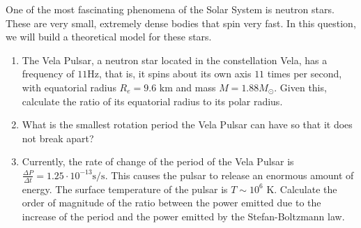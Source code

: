\documentclass[11pt]{article}
\begin{document}
\begin{pproblem} One of the most fascinating phenomena of the Solar System is neutron stars. These are very small, extremely dense bodies that spin very fast. In this question, we will build a theoretical model for these stars.
    \begin{enumerate}[label=\textbf{\alph*)}]
        \item The Vela Pulsar, a neutron star located in the constellation Vela, has a frequency of \(11 \text{Hz}\), that is, it spins about its own axis \(11\) times per second, with equatorial radius \(R_e = 9.6\text{ km}\) and mass \(M = 1.88M_\odot\). Given this, calculate the ratio of its equatorial radius to its polar radius.
        \item What is the smallest rotation period the Vela Pulsar can have so that it does not break apart?
        \item Currently, the rate of change of the period of the Vela Pulsar is \(\frac{\Delta P}{\Delta t} = 1.25 \cdot 10^{-13}\text{s/s}\). This causes the pulsar to release an enormous amount of energy. The surface temperature of the pulsar is \(T \sim 10^6\text{ K}\). Calculate the order of magnitude of the ratio between the power emitted due to the increase of the period and the power emitted by the Stefan-Boltzmann law.
    \end{enumerate}
    
\end{pproblem}
\end{document}
